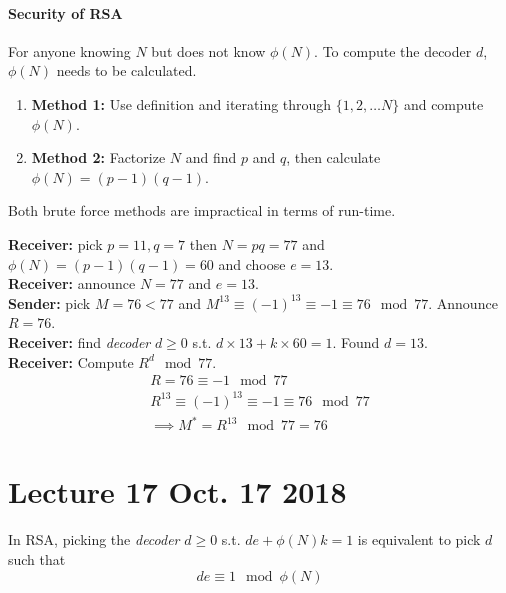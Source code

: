 \documentclass[11pt]{article}
\begin{document}
	    \paragraph{Security of RSA} For anyone knowing $N$ but does not know $\phi(N)$. To compute the decoder $d$, $\phi(N)$ needs to be calculated.
	    \begin{enumerate}
	        \item \textbf{Method 1:} Use definition and iterating through $\{1, 2, \dots N\}$ and compute $\phi(N)$.
	        \item \textbf{Method 2:} Factorize $N$ and find $p$ and $q$, then calculate $\phi(N) = (p-1)(q-1)$.
	    \end{enumerate}
	    Both brute force methods are impractical in terms of run-time.
	    
	    \begin{example} \textbf{Receiver: } pick $p=11, q=7$ then $N = pq = 77$ and $\phi(N) = (p-1)(q-1) = 60$ and choose $e=13$. \\
	    \textbf{Receiver: } announce $N=77$ and $e=13$. \\
	    \textbf{Sender: } pick $M = 76 < 77$ and $M^{13} \equiv (-1)^13 \equiv -1 \equiv 76 \mod 77$. Announce $R=76$. \\
	    \textbf{Receiver: } find \emph{decoder} $d \geq 0$ s.t. $d \times 13 + k \times 60 = 1$. Found $d = 13$. \\
	    \textbf{Receiver: } Compute $R^d \mod 77$. \\
	    \begin{gather*}
	        R = 76 \equiv -1 \mod 77 \\
	        R^{13} \equiv (-1)^{13} \equiv -1 \equiv 76 \mod 77 \\
	        \implies M^* = R^{13} \mod 77 = 76 
	    \end{gather*}
	    \end{example}
	\section{Lecture 17 Oct. 17 2018}
		\begin{remark}
			In RSA, picking the \emph{decoder} $d \geq 0$ s.t. $de + \phi(N)k = 1$ is equivalent to pick $d$ such that
			\[
				de \equiv 1 \mod \phi(N)
			\]
		\end{remark}
		
\end{document}
